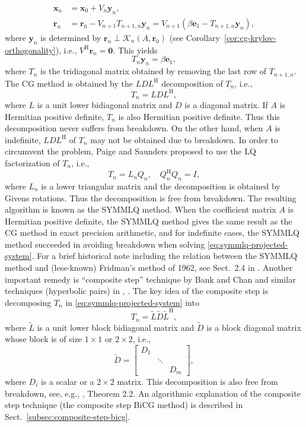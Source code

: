 \[\begin{aligned}
\bm x_n&=\bm x_0+V_n\bm y_n,\\
\bm r_n&=\bm r_0-V_{n+1}T_{n+1,n}\bm y_n=V_{n+1}(\beta\bm e_1-T_{n+1,n}\bm y_n),
\end{aligned}\]
{where $\bm y_n$ is determined by $\bm r_n\perp\mathcal K_n(A,\bm r_0)$ (see Corollary\ \ref{cor:cg-krylov-orthogonality}), i.e., $V^{\mathrm H}\bm r_n=\bm0$. This yields}
\begin{equation}\label{eq:symmlq-projected-system}T_n\bm y_n=\beta\bm e_1,\end{equation}
{where $T_n$ is the tridiagonal matrix obtained by removing the last row of $T_{n+1,n}$. The CG method is obtained by the $LDL^{\mathrm H}$ decomposition of $T_n$, i.e.,}
\[T_n=LDL^{\mathrm H},\]
{where $L$ is a unit lower bidiagonal matrix and $D$ is a diagonal matrix. If $A$ is Hermitian positive definite, $T_n$ is also Hermitian positive definite. Thus this decomposition never suffers from breakdown. On the other hand, when $A$ is indefinite, $LDL^{\mathrm H}$ of $T_n$ may not be obtained due to breakdown.}
{In order to circumvent the problem, Paige and Saunders proposed to use the LQ factorization of $T_n$, i.e.,}
\[T_n=L_nQ_n,\quad Q_n^{\mathrm H}Q_n=I,\]
{where $L_n$ is a lower triangular matrix and the decomposition is obtained by Givens rotations. Thus the decomposition is free from breakdown. The resulting algorithm is known as the SYMMLQ method. When the coefficient matrix $A$ is Hermitian positive definite, the SYMMLQ method gives the same result as the CG method in exact precision arithmetic, and for indefinite cases, the SYMMLQ method succeeded in avoiding breakdown when solving \eqref{eq:symmlq-projected-system}. For a brief historical note including the relation between the SYMMLQ method and (less-known) Fridman's method of 1962, see Sect.\ 2.4 in .}
{Another important remedy is ``composite step'' technique by Bank and Chan  and similar techniques (hyperbolic pairs) in , . The key idea of the composite step is decomposing $T_n$ in \eqref{eq:symmlq-projected-system} into}
\[T_n=\widetilde L\widetilde D\widetilde L^{\mathrm H},\]
{where $\widetilde L$ is a unit lower block bidiagonal matrix and $\widetilde D$ is a block diagonal matrix whose block is of size $1\times1$ or $2\times2$, i.e.,}
\[\widetilde D=\begin{bmatrix}D_1&&\\&\ddots&\\&&D_m\end{bmatrix},\]
{where $D_i$ is a scalar or a $2\times2$ matrix. This decomposition is also free from breakdown, see, e.g., , Theorem 2.2. An algorithmic explanation of the composite step technique (the composite step BiCG method) is described in Sect.\ \ref{subsec:composite-step-bicg}.}
